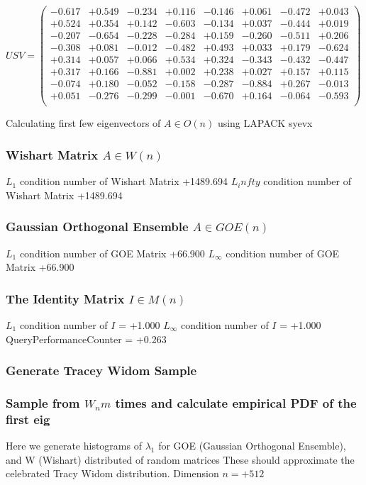 \documentclass[9pt]{article}
\theoremstyle{plain}
\theoremstyle{definition}
\theoremstyle{remark}
\numberwithin{equation}{section}
\begin{document}
$U S V = \left(
\begin{array}{
cccccccc}
-0.617 & +0.549 & -0.234 & +0.116 & -0.146 & +0.061 & -0.472 & +0.043 \\
+0.524 & +0.354 & +0.142 & -0.603 & -0.134 & +0.037 & -0.444 & +0.019 \\
-0.207 & -0.654 & -0.228 & -0.284 & +0.159 & -0.260 & -0.511 & +0.206 \\
-0.308 & +0.081 & -0.012 & -0.482 & +0.493 & +0.033 & +0.179 & -0.624 \\
+0.314 & +0.057 & +0.066 & +0.534 & +0.324 & -0.343 & -0.432 & -0.447 \\
+0.317 & +0.166 & -0.881 & +0.002 & +0.238 & +0.027 & +0.157 & +0.115 \\
-0.074 & +0.180 & -0.052 & -0.158 & -0.287 & -0.884 & +0.267 & -0.013 \\
+0.051 & -0.276 & -0.299 & -0.001 & -0.670 & +0.164 & -0.064 & -0.593 \\
\end{array}
\right)$ \newline 

Calculating first few eigenvectors of $A \in O(n)$ using LAPACK syevx

\subsubsection{Wishart Matrix $A \in W(n)$}
$L_1$ condition number of Wishart Matrix +1489.694
$L_infty$ condition number of Wishart Matrix +1489.694
\subsubsection{Gaussian Orthogonal Ensemble $A \in GOE(n)$}
$L_1$ condition number of GOE Matrix +66.900
$L_\infty$ condition number of GOE Matrix +66.900
\subsubsection{The Identity Matrix $I \in M(n)$}
$L_1$ condition number of $I$ = +1.000
$L_\infty$ condition number of $I$ = +1.000
QueryPerformanceCounter  =  +0.263
\subsubsection{Generate Tracey Widom Sample}
\subsubsection{Sample from $W_n m$ times and calculate empirical PDF of the first eig}
Here we generate histograms of $\lambda_1$ for GOE (Gaussian Orthogonal Ensemble), and W (Wishart) 		 distributed of random matrices
These should approximate the celebrated Tracy Widom distribution.
Dimension $n = +512$
\end{document}
